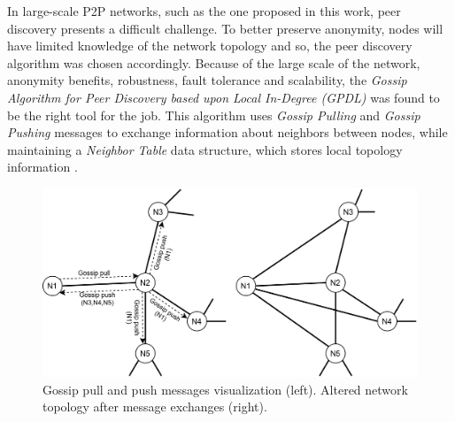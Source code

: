 In large-scale P2P networks, such as the one proposed in this work, peer 
discovery presents a difficult challenge. To better preserve anonymity, nodes 
will have limited knowledge of the network topology and so, the peer discovery 
algorithm was chosen accordingly. Because of the large scale of the network, 
anonymity benefits, robustness, fault tolerance and scalability, the 
\textit{Gossip Algorithm for Peer Discovery based upon Local In-Degree (GPDL)} 
was found to be the right tool for the job. This algorithm uses \textit{Gossip 
Pulling} and \textit{Gossip Pushing} messages to exchange information about 
neighbors between nodes, while maintaining a \textit{Neighbor Table} data 
structure, which stores local topology information \cite{peerdiscovery}.

\begin{figure}
    \centering
    \includegraphics[width=\textwidth]{figures/fig1}
    \caption{Gossip pull and push messages visualization (left). Altered 
network topology after message exchanges (right).}
    \label{fig:fig1}
\end{figure}


